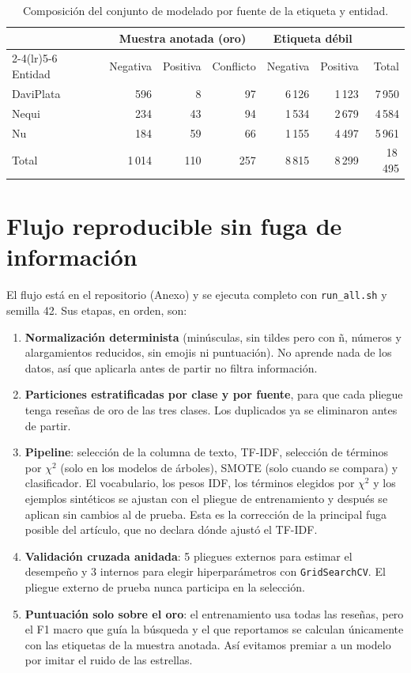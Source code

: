 \documentclass[11pt,a4paper]{article}
\begin{document}
\begin{table}[h]
\centering\small
\caption{Composición del conjunto de modelado por fuente de la etiqueta y entidad.}\label{tab:conjunto}
\begin{tabular}{lrrrrrr}
\toprule
 & \multicolumn{3}{c}{Muestra anotada (oro)} & \multicolumn{2}{c}{Etiqueta débil} & \\
\cmidrule(lr){2-4}\cmidrule(lr){5-6}
Entidad & Negativa & Positiva & Conflicto & Negativa & Positiva & Total \\
\midrule
DaviPlata & 596 & 8 & 97 & 6\,126 & 1\,123 & 7\,950 \\
Nequi & 234 & 43 & 94 & 1\,534 & 2\,679 & 4\,584 \\
Nu & 184 & 59 & 66 & 1\,155 & 4\,497 & 5\,961 \\
\midrule
Total & 1\,014 & 110 & 257 & 8\,815 & 8\,299 & 18\,495 \\
\bottomrule
\end{tabular}
\end{table}

\section{Flujo reproducible sin fuga de información}
El flujo está en el repositorio (Anexo) y se ejecuta completo con \texttt{run\_all.sh} y semilla
42. Sus etapas, en orden, son:
\begin{enumerate}
\item \textbf{Normalización determinista} (minúsculas, sin tildes pero con ñ, números y
  alargamientos reducidos, sin emojis ni puntuación). No aprende nada de los datos, así que
  aplicarla antes de partir no filtra información.
\item \textbf{Particiones estratificadas por clase y por fuente}, para que cada pliegue tenga
  reseñas de oro de las tres clases. Los duplicados ya se eliminaron antes de partir.
\item \textbf{Pipeline}: selección de la columna de texto, TF-IDF, selección de términos por
  $\chi^2$ (solo en los modelos de árboles), SMOTE (solo cuando se compara) y clasificador. El
  vocabulario, los pesos IDF, los términos elegidos por $\chi^2$ y los ejemplos sintéticos se
  ajustan con el pliegue de entrenamiento y después se aplican sin cambios al de prueba. Esta es
  la corrección de la principal fuga posible del artículo, que no declara dónde ajustó el TF-IDF.
\item \textbf{Validación cruzada anidada}: 5 pliegues externos para estimar el desempeño y 3
  internos para elegir hiperparámetros con \texttt{GridSearchCV}. El pliegue externo de prueba
  nunca participa en la selección.
\item \textbf{Puntuación solo sobre el oro}: el entrenamiento usa todas las reseñas, pero el F1
  macro que guía la búsqueda y el que reportamos se calculan únicamente con las etiquetas
  de la muestra anotada. Así evitamos premiar a un modelo por imitar el ruido de las estrellas.
\end{enumerate}
\end{document}
